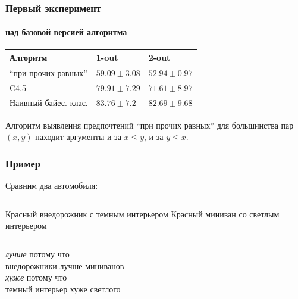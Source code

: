 \documentclass{beamer}
\theoremstyle{definition}
\begin{document}
	\begin{frame}
		\frametitle{Первый эксперимент}
		\framesubtitle{над базовой версией алгоритма}
		\begin{center}
			\begin{tabular}{|l|ll|}
				\hline
				Алгоритм             & 1-out & 2-out \\ \hline
				\enquote{при прочих равных}      & $59.09 \pm 3.08$ & $52.94 \pm 0.97$ \\
				C4.5                 & $79.91 \pm 7.29$ & $71.61 \pm 8.97$ \\
				Наивный байес. клас. & $83.76 \pm 7.2$ & $82.69 \pm 9.68$ \\ \hline
			\end{tabular}
		\end{center}
		
		\vspace{1.5em}
		Алгоритм выявления предпочтений \enquote{при прочих равных} для большинства пар $(x,y)$ находит аргументы и за $x \leq y$, и за $y \leq x$.
	\end{frame}
	
	\begin{frame}
		\frametitle{Пример}
		\begin{center}
			Сравним два автомобиля:
		\end{center}
		\begin{columns}[c] 
			\column{.5\textwidth} 
			Красный внедорожник с темным интерьером
	    	\column{.5\textwidth}
	    	Красный миниван со светлым интерьером
		\end{columns}
		\begin{center}
			\vspace{2em}
			\emph{лучше} потому что \\внедорожники лучше миниванов \\
			\vspace{2em}
			\emph{хуже} потому что \\темный интерьер хуже светлого 
		\end{center}
	\end{frame}
	
\end{document}
